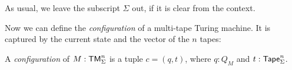As usual, we leave the subscript $\Sigma$ out, if it is clear from the context.


Now we can define the \emph{configuration} of a multi-tape Turing machine.  It is captured by the current state and the vector of the $n$ tapes:
\begin{definition}[Configuration]
  \label{def:config}
  A \emph{configuration} of $M: \textsf{TM}_\Sigma^n$ is a tuple $c = (q, t)$, where $q: Q_M$ and $t: \textsf{Tape}_\Sigma^n$.
\end{definition}


